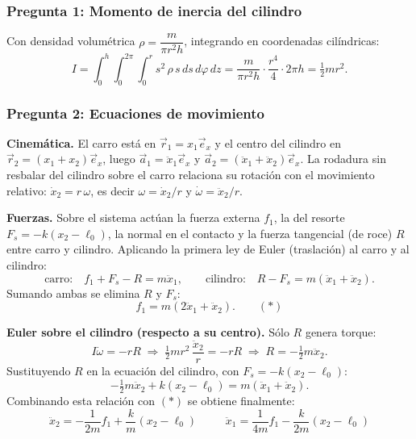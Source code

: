 \begin{sol}

\subsubsection*{Pregunta 1: Momento de inercia del cilindro}

Con densidad volumétrica $\rho=\dfrac{m}{\pi r^2 h}$, integrando en coordenadas cilíndricas:
$$I = \int_0^h\!\!\int_0^{2\pi}\!\!\int_0^r s^2\,\rho\,s\,ds\,d\varphi\,dz
= \frac{m}{\pi r^2 h}\cdot\frac{r^4}{4}\cdot 2\pi h = \boxed{\tfrac12 mr^2}.$$

\subsubsection*{Pregunta 2: Ecuaciones de movimiento}

\textbf{Cinemática.} El carro está en $\vec{r}_1=x_1\vec{e}_x$ y el centro del cilindro en
$\vec{r}_2=(x_1+x_2)\vec{e}_x$, luego $\vec{a}_1=\ddot{x}_1\vec{e}_x$ y
$\vec{a}_2=(\ddot{x}_1+\ddot{x}_2)\vec{e}_x$. La rodadura sin resbalar del cilindro sobre el
carro relaciona su rotación con el movimiento relativo: $\dot{x}_2 = r\,\omega$, es decir
$\omega=\dot{x}_2/r$ y $\dot\omega=\ddot{x}_2/r$.

\textbf{Fuerzas.} Sobre el sistema actúan la fuerza externa $f_1$, la del resorte
$F_s=-k(x_2-\ell_0)$, la normal en el contacto y la fuerza tangencial (de roce) $R$ entre carro
y cilindro. Aplicando la primera ley de Euler (traslación) al carro y al cilindro:
$$\text{carro:}\quad f_1 + F_s - R = m\ddot{x}_1,\qquad
\text{cilindro:}\quad R - F_s = m(\ddot{x}_1+\ddot{x}_2).$$
Sumando ambas se elimina $R$ y $F_s$:
$$f_1 = m(2\ddot{x}_1 + \ddot{x}_2). \qquad (\ast)$$

\textbf{Euler sobre el cilindro (respecto a su centro).} Sólo $R$ genera torque:
$$I\dot\omega = -rR \;\Longrightarrow\; \tfrac12 mr^2\,\frac{\ddot{x}_2}{r} = -rR
\;\Longrightarrow\; R = -\tfrac12 m\ddot{x}_2.$$
Sustituyendo $R$ en la ecuación del cilindro, con $F_s=-k(x_2-\ell_0)$:
$$-\tfrac12 m\ddot{x}_2 + k(x_2-\ell_0) = m(\ddot{x}_1+\ddot{x}_2).$$
Combinando esta relación con $(\ast)$ se obtiene finalmente:
$$\boxed{\;\ddot{x}_2 = -\frac{1}{2m}f_1 + \frac{k}{m}(x_2-\ell_0)\;}\qquad
\boxed{\;\ddot{x}_1 = \frac{1}{4m}f_1 - \frac{k}{2m}(x_2-\ell_0)\;}$$

\end{sol}
